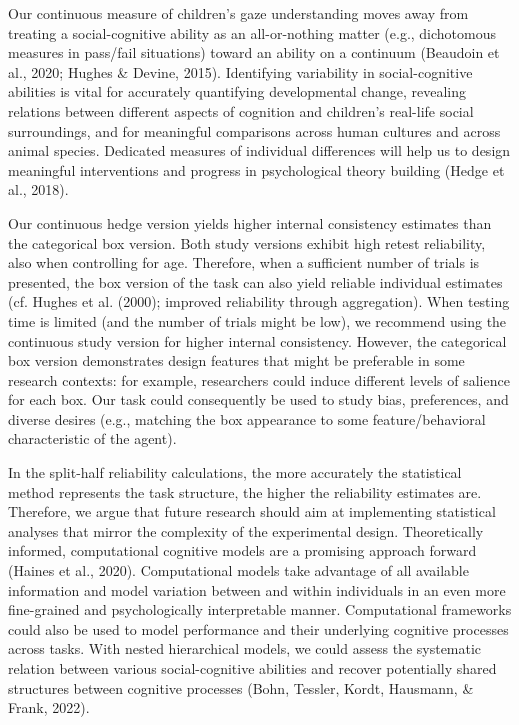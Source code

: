 \documentclass[
  man,floatsintext]{apa6}
\begin{document}
Our continuous measure of children's gaze understanding moves away from treating a social-cognitive ability as an all-or-nothing matter (e.g., dichotomous measures in pass/fail situations) toward an ability on a continuum (Beaudoin et al., 2020; Hughes \& Devine, 2015).
Identifying variability in social-cognitive abilities is vital for accurately quantifying developmental change, revealing relations between different aspects of cognition and children's real-life social surroundings, and for meaningful comparisons across human cultures and across animal species.
Dedicated measures of individual differences will help us to design meaningful interventions and progress in psychological theory building (Hedge et al., 2018).

Our continuous hedge version yields higher internal consistency estimates than the categorical box version.
Both study versions exhibit high retest reliability, also when controlling for age.
Therefore, when a sufficient number of trials is presented, the box version of the task can also yield reliable individual estimates (cf. Hughes et al. (2000); improved reliability through aggregation).
When testing time is limited (and the number of trials might be low), we recommend using the continuous study version for higher internal consistency.
However, the categorical box version demonstrates design features that might be preferable in some research contexts: for example, researchers could induce different levels of salience for each box.
Our task could consequently be used to study bias, preferences, and diverse desires (e.g., matching the box appearance to some feature/behavioral characteristic of the agent).

In the split-half reliability calculations, the more accurately the statistical method represents the task structure, the higher the reliability estimates are.
Therefore, we argue that future research should aim at implementing statistical analyses that mirror the complexity of the experimental design.
Theoretically informed, computational cognitive models are a promising approach forward (Haines et al., 2020).
Computational models take advantage of all available information and model variation between and within individuals in an even more fine-grained and psychologically interpretable manner.
Computational frameworks could also be used to model performance and their underlying cognitive processes across tasks.
With nested hierarchical models, we could assess the systematic relation between various social-cognitive abilities and recover potentially shared structures between cognitive processes (Bohn, Tessler, Kordt, Hausmann, \& Frank, 2022).
\end{document}

